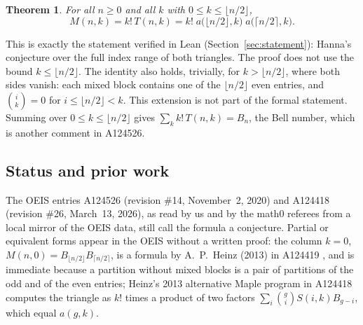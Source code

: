 \documentclass[11pt]{amsart}
\theoremstyle{plain}
\newtheorem{theorem}{Theorem}
\theoremstyle{definition}
\begin{document}
\begin{theorem}\label{thm:main}
For all $n\ge0$ and all $k$ with $0\le k\le\lfloor n/2\rfloor$,
\[
  M(n,k)=k!\,T(n,k)=k!\;a\bigl(\lfloor n/2\rfloor,k\bigr)\;a\bigl(\lceil n/2\rceil,k\bigr).
\]
\end{theorem}

This is exactly the statement verified in Lean (Section~\ref{sec:statement}): Hanna's conjecture over the full index range of both triangles.
The proof does not use the bound $k\le\lfloor n/2\rfloor$. The identity also holds, trivially, for $k>\lfloor n/2\rfloor$, where both sides vanish: each mixed block contains one of the $\lfloor n/2\rfloor$ even entries, and $\binom ik=0$ for $i\le\lfloor n/2\rfloor<k$. This extension is not part of the formal statement.
Summing over $0\le k\le\lfloor n/2\rfloor$ gives $\sum_k k!\,T(n,k)=B_n$, the Bell number, which is another comment in A124526.

\subsection*{Status and prior work}
The OEIS entries A124526 (revision \#14, November~2, 2020) and A124418 (revision \#26, March~13, 2026), as read by us and by the math0 referees from a local mirror of the OEIS data, still call the formula a conjecture.
Partial or equivalent forms appear in the OEIS without a written proof: the column $k=0$, $M(n,0)=B_{\lfloor n/2\rfloor}B_{\lceil n/2\rceil}$, is a formula by A.~P.~Heinz (2013) in A124419 \cite{A124419}, and is immediate because a partition without mixed blocks is a pair of partitions of the odd and of the even entries; Heinz's 2013 alternative Maple program in A124418 computes the triangle as $k!$ times a product of two factors $\sum_i\binom gi S(i,k)B_{g-i}$, which equal $a(g,k)$.
\end{document}
